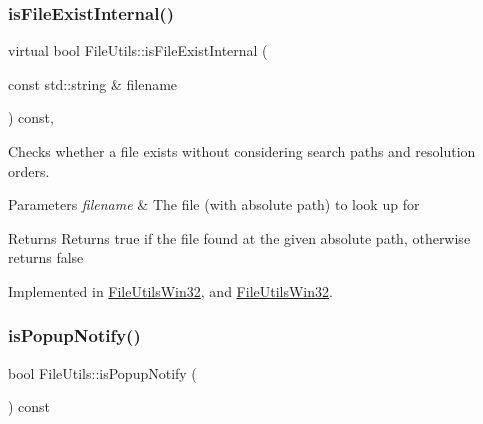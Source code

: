 \mbox{\label{classFileUtils_a0e1dc78cbe5ac5689e1f67ebd4413bab}} 
\subsubsection{\texorpdfstring{is\+File\+Exist\+Internal()}{isFileExistInternal()}\hspace{0.1cm}{\footnotesize\ttfamily [2/2]}}
{\footnotesize\ttfamily virtual bool File\+Utils\+::is\+File\+Exist\+Internal (\begin{DoxyParamCaption}\item[{const std\+::string \&}]{filename }\end{DoxyParamCaption}) const\hspace{0.3cm}{\ttfamily [protected]}, {}}

Checks whether a file exists without considering search paths and resolution orders. 
\begin{DoxyParams}{Parameters}
{\em filename} & The file (with absolute path) to look up for \\
\hline
\end{DoxyParams}
\begin{DoxyReturn}{Returns}
Returns true if the file found at the given absolute path, otherwise returns false 
\end{DoxyReturn}


Implemented in \hyperlink{classFileUtilsWin32_aacf984dcf838fc8d3303e47eb33a8601}{File\+Utils\+Win32}, and \hyperlink{classFileUtilsWin32_ab3538e3fa4418afbff4e95858a553ff7}{File\+Utils\+Win32}.

\mbox{\label{classFileUtils_acf344799ae42662fd4371b44ecaac739}} 
\subsubsection{\texorpdfstring{is\+Popup\+Notify()}{isPopupNotify()}\hspace{0.1cm}{\footnotesize\ttfamily [1/2]}}
{\footnotesize\ttfamily bool File\+Utils\+::is\+Popup\+Notify (\begin{DoxyParamCaption}{ }\end{DoxyParamCaption}) const\hspace{0.3cm}{\ttfamily [virtual]}}

